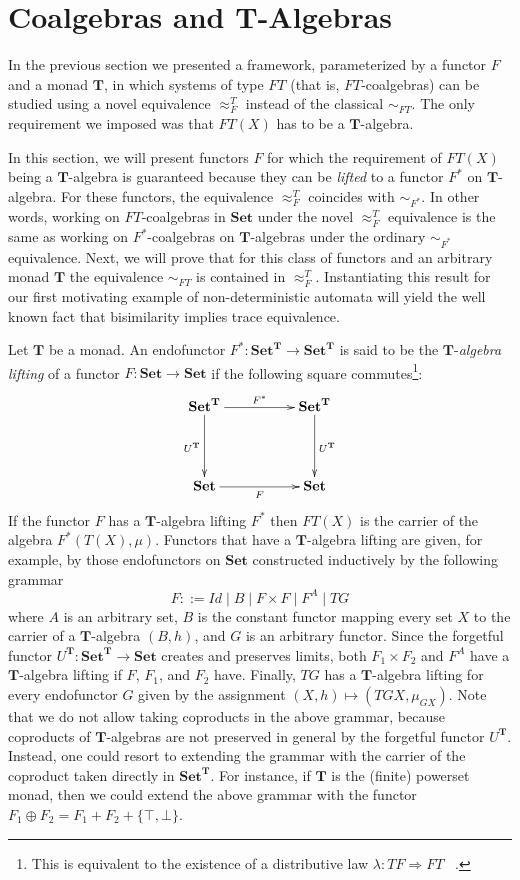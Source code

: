 \documentclass{LMCS}
\def\T{\mathbf{T}}
\def\Set{\mathbf{Set}}
\begin{document}
\section{Coalgebras and $\T$-Algebras}\label{sec:bisim_implies_trace}
In the previous section we presented a framework, parameterized by a
functor $F$ and a monad $\T$, in which systems of type $FT$ (that
is, $FT$-coalgebras) can be studied using a novel equivalence
$\approx^T_F$ instead of the classical $\sim_{FT}$. The only
requirement we imposed was that $FT(X)$ has to be a $\T$-algebra.

In this section, we will present functors $F$ for which the requirement of $FT(X)$ being a
$\T$-algebra is guaranteed because they can be {\em lifted} to a functor $F^*$ on $\T$-algebra.
For these functors, the equivalence $\approx^T_F$ coincides with $\sim_{F^*}$. In other words,
working on  $FT$-coalgebras in $\Set$ under the novel $\approx^T_F$ equivalence is the same
as working on $F^*$-coalgebras on $\T$-algebras under the ordinary
$\sim_{F^*}$ equivalence. Next, we will prove that for this class of functors and an arbitrary monad $\T$ the equivalence
$\sim_{FT}$ is contained in $\approx^T_F$. Instantiating this result for our first motivating
example of non-deterministic automata will yield the well known fact that bisimilarity implies
trace equivalence.

Let $\T$ be a monad. An endofunctor $F^*\colon\Set^\T \to \Set^\T$ is
said to be the $\T$-\emph{algebra lifting} of a functor $F\colon\Set
\to \Set$ if the following square commutes\footnote{This is
equivalent to the existence of a distributive law $\lambda\colon TF
\Rightarrow FT$ ~\cite{Joh75}.}:
\[
\xymatrix@C=1.75cm@R=1.5cm{
\Set^\T \ar[d]_{U^\T}\ar[r]^{F^*} & \Set^\T \ar[d]^{U^\T}\\
\Set \ar[r]_{F} & \Set
}
\]
If the functor $F$ has a $\T$-algebra
lifting $F^*$ then $FT(X)$ is the carrier of the algebra $F^*(T(X),\mu)$.  Functors that
have a $\T$-algebra lifting are given, for example, by those endo\-functors on $\Set$
constructed inductively by the following grammar
\[
F ::=  \mathit{Id}  \mid B \mid F \times F \mid F^A \mid TG
\]
where $A$ is an arbitrary set, $B$ is the constant functor mapping
every set $X$ to the carrier of a $\T$-algebra $(B,h)$, and $G$ is
an arbitrary functor. Since the forgetful functor $U^\T\colon
\Set^\T \rightarrow \Set$ creates and preserves limits, both $F_1
\times F_2$ and $F^A$ have  a $\T$-algebra lifting if $F$, $F_1$,
and $F_2$ have. Finally, $TG$ has a $\T$-algebra lifting for every
endofunctor $G$ given by the assignment $(X,h) \mapsto
(TGX,\mu_{GX})$. Note that we do not allow taking coproducts in the
above grammar, because coproducts of $\T$-algebras are not preserved
in general by the forgetful functor $U^\T$. Instead, one could
resort to extending the grammar with the carrier of the coproduct
taken directly in $\Set^\T$. For instance, if $\T$ is the (finite)
powerset monad, then we could extend the above grammar with the
functor $F_1 \oplus F_2 = F_1 + F_2 + \{\top,\bot\}$.
\end{document}
